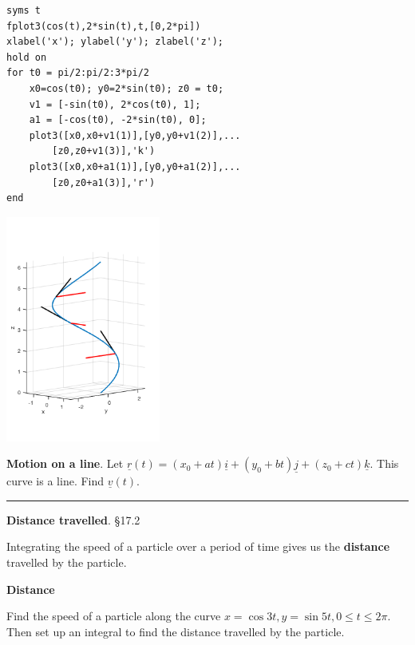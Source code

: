 \documentclass[12pt,letterpaper,noanswers]{exam}
\newcommand{\mb}[1]{\underline{#1}}
\begin{document}
\begin{multicols}{2}
\begin{lstlisting}
syms t
fplot3(cos(t),2*sin(t),t,[0,2*pi])
xlabel('x'); ylabel('y'); zlabel('z');
hold on
for t0 = pi/2:pi/2:3*pi/2
    x0=cos(t0); y0=2*sin(t0); z0 = t0;
    v1 = [-sin(t0), 2*cos(t0), 1];
    a1 = [-cos(t0), -2*sin(t0), 0];
    plot3([x0,x0+v1(1)],[y0,y0+v1(2)],...
        [z0,z0+v1(3)],'k')
    plot3([x0,x0+a1(1)],[y0,y0+a1(2)],...
        [z0,z0+a1(3)],'r')
end
\end{lstlisting}

\includegraphics[width=2in]{img/C23p3-18.png}


\end{multicols}

\vfill


\noindent\textbf{Motion on a line}.  Let $\mb r(t) = (x_0+at)\mb i + (y_0 + bt)\mb j + (z_0+ct)\mb k$.  This curve is a line.  Find $\mb v(t)$.


\vspace{1in}

\vspace{0.2cm}
\hrule
\vspace{0.2cm}
\noindent\textbf{Distance travelled}. \S 17.2
\begin{tcolorbox}
Integrating the speed of a particle over a period of time gives us the \textbf{distance} travelled by the particle.
\end{tcolorbox}


\noindent\textbf{Distance}

Find the speed of a particle along the curve $x = \cos 3t, y= \sin 5t, 0\leq t\leq 2\pi$.  Then set up an integral to find the distance travelled by the particle.

\vspace{2in}
\end{document}

